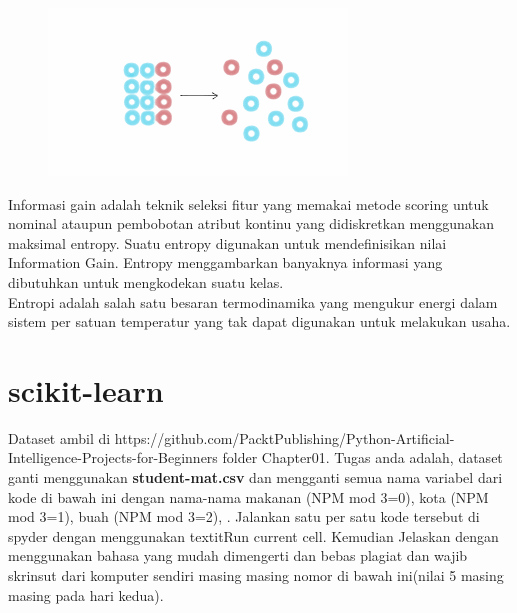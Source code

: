 \begin{enumerate}
\begin{figure}[!htbp]
		\includegraphics[scale=0.4]{figures/chapter2/entropi.png}
    \end{figure}
    \newpage
Informasi gain adalah  teknik seleksi fitur yang memakai metode  scoring untuk nominal ataupun pembobotan atribut kontinu yang didiskretkan menggunakan maksimal entropy. Suatu entropy  digunakan untuk mendefinisikan nilai Information Gain. Entropy menggambarkan banyaknya informasi  yang  dibutuhkan  untuk mengkodekan  suatu  kelas.\\
Entropi adalah salah satu besaran termodinamika yang mengukur energi dalam sistem per satuan temperatur yang tak dapat digunakan untuk melakukan usaha.
\end{enumerate}

\section{scikit-learn}
Dataset ambil di https://github.com/PacktPublishing/Python-Artificial-Intelligence-Projects-for-Beginners folder Chapter01.
Tugas anda adalah, dataset ganti menggunakan \textbf{student-mat.csv} dan mengganti semua nama variabel dari kode di bawah ini dengan nama-nama makanan (NPM mod 3=0), kota (NPM mod 3=1), buah (NPM mod 3=2), . Jalankan satu per satu kode tersebut di spyder dengan menggunakan textit{Run current cell}. Kemudian Jelaskan dengan menggunakan bahasa yang mudah dimengerti dan bebas plagiat dan wajib skrinsut dari komputer sendiri masing masing nomor di bawah ini(nilai 5 masing masing pada hari kedua).

